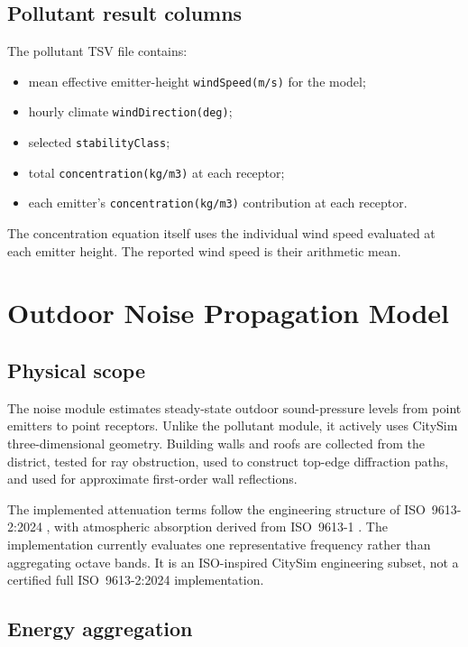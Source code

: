 \documentclass[11pt,a4paper]{article}
\newcommand{\code}[1]{\texttt{#1}}
\begin{document}
\subsection{Pollutant result columns}

The pollutant TSV file contains:
\begin{itemize}
  \item mean effective emitter-height \code{windSpeed(m/s)} for the model;
  \item hourly climate \code{windDirection(deg)};
  \item selected \code{stabilityClass};
  \item total \code{concentration(kg/m3)} at each receptor;
  \item each emitter's \code{concentration(kg/m3)} contribution at each receptor.
\end{itemize}
The concentration equation itself uses the individual wind speed evaluated at
each emitter height. The reported wind speed is their arithmetic mean.

\section{Outdoor Noise Propagation Model}

\subsection{Physical scope}

The noise module estimates steady-state outdoor sound-pressure levels from
point emitters to point receptors. Unlike the pollutant module, it actively
uses CitySim three-dimensional geometry. Building walls and roofs are collected
from the district, tested for ray obstruction, used to construct top-edge
diffraction paths, and used for approximate first-order wall reflections.

The implemented attenuation terms follow the engineering structure of
ISO~9613-2:2024 \cite{iso9613-2}, with atmospheric absorption derived from
ISO~9613-1 \cite{iso9613-1}. The implementation currently evaluates one
representative frequency rather than aggregating octave bands. It is an
ISO-inspired CitySim engineering subset, not a certified full
ISO~9613-2:2024 implementation.

\subsection{Energy aggregation}
\end{document}
